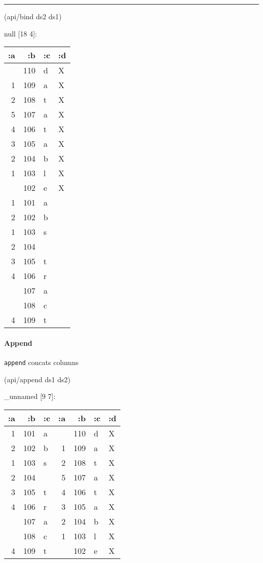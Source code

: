 \documentclass[]{article}
\newenvironment{Shaded}{\begin{snugshade}}{\end{snugshade}}
\newcommand{\NormalTok}[1]{#1}
\let\oldparagraph\paragraph
\renewcommand{\paragraph}[1]{\oldparagraph{#1}\mbox{}}
\begin{document}
\begin{center}\rule{0.5\linewidth}{0.5pt}\end{center}

\begin{Shaded}
\begin{Highlighting}[]
\NormalTok{(api/bind ds2 ds1)}
\end{Highlighting}
\end{Shaded}

null {[}18 4{]}:

\begin{longtable}[]{@{}rrll@{}}
\toprule
:a & :b & :c & :d\tabularnewline
\midrule
\endhead
& 110 & d & X\tabularnewline
1 & 109 & a & X\tabularnewline
2 & 108 & t & X\tabularnewline
5 & 107 & a & X\tabularnewline
4 & 106 & t & X\tabularnewline
3 & 105 & a & X\tabularnewline
2 & 104 & b & X\tabularnewline
1 & 103 & l & X\tabularnewline
& 102 & e & X\tabularnewline
1 & 101 & a &\tabularnewline
2 & 102 & b &\tabularnewline
1 & 103 & s &\tabularnewline
2 & 104 & &\tabularnewline
3 & 105 & t &\tabularnewline
4 & 106 & r &\tabularnewline
& 107 & a &\tabularnewline
& 108 & c &\tabularnewline
4 & 109 & t &\tabularnewline
\bottomrule
\end{longtable}

\paragraph{Append}\label{append}

\texttt{append} concats columns

\begin{Shaded}
\begin{Highlighting}[]
\NormalTok{(api/append ds1 ds2)}
\end{Highlighting}
\end{Shaded}

\_unnamed {[}9 7{]}:

\begin{longtable}[]{@{}rrlrrll@{}}
\toprule
:a & :b & :c & :a & :b & :c & :d\tabularnewline
\midrule
\endhead
1 & 101 & a & & 110 & d & X\tabularnewline
2 & 102 & b & 1 & 109 & a & X\tabularnewline
1 & 103 & s & 2 & 108 & t & X\tabularnewline
2 & 104 & & 5 & 107 & a & X\tabularnewline
3 & 105 & t & 4 & 106 & t & X\tabularnewline
4 & 106 & r & 3 & 105 & a & X\tabularnewline
& 107 & a & 2 & 104 & b & X\tabularnewline
& 108 & c & 1 & 103 & l & X\tabularnewline
4 & 109 & t & & 102 & e & X\tabularnewline
\bottomrule
\end{longtable}
\end{document}
